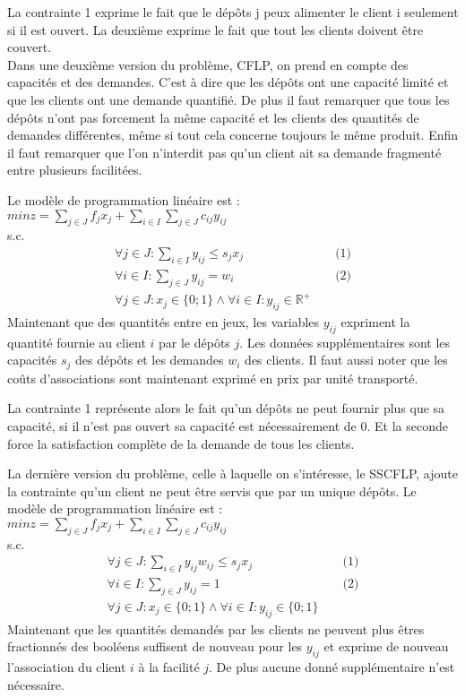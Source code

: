 \documentclass[12pt,a4paper]{article}
\begin{document}
La contrainte 1 exprime le fait que le dépôts j peux alimenter le client i seulement si il est ouvert. La deuxième exprime le fait que tout les clients doivent être couvert.\\

Dans une deuxième version du problème, CFLP, on prend en compte des capacités et des demandes. C'est à dire que les dépôts ont une capacité limité et que les clients ont une demande quantifié. De plus il faut remarquer que tous les dépôts n'ont pas forcement la même capacité et les clients des quantités de demandes différentes, même si tout cela concerne toujours le même produit. Enfin il faut remarquer que l'on n'interdit pas qu'un client ait sa demande fragmenté entre plusieurs facilitées.

Le modèle de programmation linéaire est :\\
$min z = \sum \limits_{j \in J} f_j x_j + \sum \limits_{i \in I} \sum \limits_{j \in J} c_{ij} y_{ij}$\\
s.c.
\begin{align*}
 \forall j \in J : \sum \limits_{i \in I} y_{ij} \leqslant s_j x_j & & \text{ (1)} \\
 \forall i \in I : \sum \limits_{j \in J} y_{ij} = w_i & & \text{ (2)}\\
 \forall j \in J : x_j \in \{0;1\} \land \forall i \in I : y_{ij} \in \mathbb{R}^{+} 
\end{align*}
Maintenant que des quantités entre en jeux, les variables $y_{ij}$ expriment la quantité fournie au client $i$ par le dépôts $j$. Les données supplémentaires sont les capacités $s_j$ des dépôts et les demandes $w_i$ des clients. Il faut aussi noter que les coûts d'associations sont maintenant exprimé en prix par unité transporté.

La contrainte 1 représente alors le fait qu'un dépôts ne peut fournir plus que sa capacité, si il n'est pas ouvert sa capacité est nécessairement de 0. Et la seconde force la satisfaction complète de la demande de tous les clients.

La dernière version du problème, celle à laquelle on s'intéresse, le SSCFLP, ajoute la contrainte qu'un client ne peut être servis que par un unique dépôts.
Le modèle de programmation linéaire est :\\
$min z = \sum \limits_{j \in J} f_j x_j + \sum \limits_{i \in I} \sum \limits_{j \in J} c_{ij} y_{ij}$\\
s.c.
\begin{align*}
 \forall j \in J : \sum \limits_{i \in I} y_{ij} w_{ij} \leqslant s_j x_j & & \text{ (1)} \\
 \forall i \in I : \sum \limits_{j \in J} y_{ij} = 1 & & \text{ (2)} \\
 \forall j \in J : x_j \in \{0;1\} \land \forall i \in I : y_{ij} \in \{0;1\}
\end{align*}
Maintenant que les quantités demandés par les clients ne peuvent plus êtres fractionnés des booléens suffisent de nouveau pour les $y_{ij}$ et exprime de nouveau l'association du client $i$ à la facilité $j$. De plus aucune donné supplémentaire n'est nécessaire.
\end{document}
